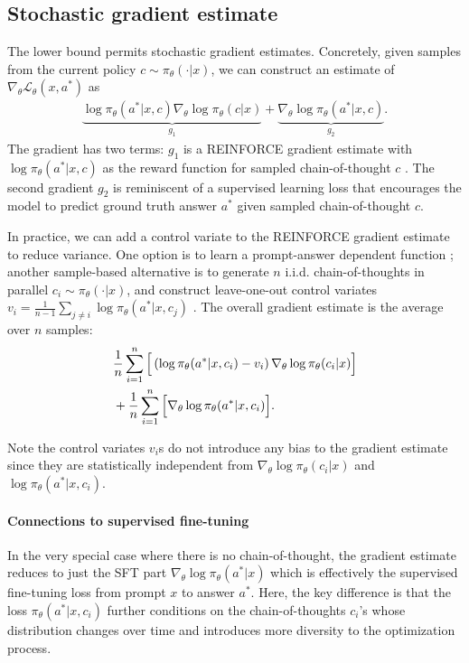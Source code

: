 \documentclass{article}
\theoremstyle{definition}
\begin{document}
\subsection{Stochastic gradient estimate}

The lower bound permits stochastic gradient estimates. Concretely, given samples from the current policy $c\sim \pi_\theta(\cdot|x)$, we can construct an estimate of $\nabla_\theta\mathcal{L}_\theta(x,a^\ast)$ as 
\begin{align}
    \underbrace{\log 
 \pi_\theta(a^\ast|x,c) \nabla_\theta  \log \pi_\theta(c|x)}_{g_1} + \underbrace{\nabla_\theta \log \pi_\theta(a^\ast|x,c)}_{g_2}. \label{eq:gradient}
\end{align}
The gradient has two terms: $g_1$ is a REINFORCE gradient estimate with $\log 
 \pi_\theta(a^\ast|x,c)$ as the reward function for sampled chain-of-thought $c$ \citep{william1933}. The second gradient $g_2$ is reminiscent of a supervised learning loss that encourages the model to predict ground truth answer $a^\ast$ given sampled chain-of-thought $c$.

In practice, we can add a control variate to the REINFORCE gradient estimate to reduce variance. One option is to learn a prompt-answer dependent function  \citep{schulman2017}; another sample-based alternative is to generate $n$ i.i.d. chain-of-thoughts in parallel $c_i\sim \pi_\theta(\cdot|x)$, and construct leave-one-out control variates $v_i=\frac{1}{n-1}\sum_{j\neq i} \log \pi_\theta(a^\ast|x,c_j)$ \citep{mnih2016variational,kool2019buy,tang2025optimizing}. The overall gradient estimate is the average over $n$ samples:
\begin{align}
& \frac 1n \sum_{i=1}^n \Big[
 \left(\log \pi_\theta(a^\ast|x,c_i) - v_i\right) \nabla_\theta  \log \pi_\theta(c_i|x)\Big] \notag \\
&+  \frac 1n \sum_{i=1}^n \Big[ \nabla_\theta \log \pi_\theta(a^\ast|x,c_i)\Big].\label{eq:lower-bound-gradient}
\end{align}

Note the control variates $v_i$s do not introduce any bias to the gradient estimate since they are statistically independent from $\nabla_\theta \log \pi_\theta(c_i|x)$ and $\log \pi_\theta(a^*|x,c_i)$.

\paragraph{Connections to supervised fine-tuning} In the very special case where there is no chain-of-thought, the gradient estimate reduces to just the SFT part $
    \nabla_\theta \log \pi_\theta(a^\ast|x)$
which is effectively the supervised fine-tuning loss from prompt $x$ to answer $a^\ast$. Here, the key difference is that the loss $\pi_\theta(a^*|x,c_i)$ further conditions on the chain-of-thoughts $c_i$'s whose distribution changes over time and introduces more diversity to the optimization process. 
\end{document}
